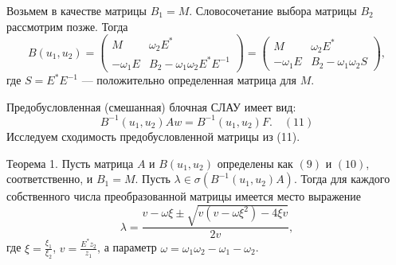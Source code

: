 \documentclass{article}
\begin{document}
Возьмем в качестве матрицы \( B_1 = M \). Словосочетание выбора матрицы \( B_2 \) рассмотрим позже. Тогда
\begin{equation}
B(u_1, u_2) = \begin{pmatrix} M & \omega_2E^* \\ -\omega_1E & B_2 - \omega_1\omega_2E^*E^{-1} \end{pmatrix} = \begin{pmatrix} M & \omega_2E^* \\ -\omega_1E & B_2 - \omega_1\omega_2S \end{pmatrix},
\end{equation}
где \( S = E^*E^{-1} \) — положительно определенная матрица для \( M \).

Предобусловленная (смешанная) блочная СЛАУ имеет вид:
\[ B^{-1}(u_1, u_2)Aw = B^{-1}(u_1, u_2)F. \quad (11) \]
Исследуем сходимость предобусловленной матрицы из (11).

Теорема 1. Пусть матрица \( A \) и \( B(u_1, u_2) \) определены как \( (9) \) и \( (10) \), соответственно, и \( B_1 = M \). Пусть \( \lambda \in \sigma(B^{-1}(u_1, u_2)A) \). Тогда для каждого собственного числа преобразованной матрицы имеется место выражение
\[
\lambda = \frac{v - \omega \xi \pm \sqrt{v (v - \omega\xi^2) - 4\xi v}}{2v},
\]
где \( \xi = \frac{\xi_1}{\xi_2} \), \( v = \frac{E^*z_2}{z_1} \), а параметр \( \omega = \omega_1\omega_2 - \omega_1 - \omega_2 \).
\end{document}
